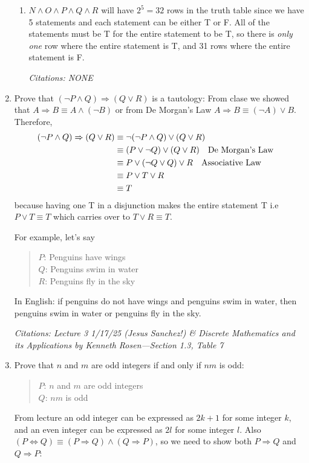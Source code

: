 \documentclass[11pt]{article}
\begin{document}
\begin{enumerate}
\begin{enumerate}
    \item $N \land O \land P \land Q \land R$ will have $2^5 = 32$ rows in the truth table since
    we have 5 statements and each statement can be either T or F. All of the statements must be T
    for the entire statement to be T, so there is \emph{only one} row where the entire statement is T, and
    31 rows where the entire statement is F.

    \textit{Citations: NONE}
  \end{enumerate}

  \newpage
  \item Prove that $(\neg P \land Q) \Rightarrow (Q \lor R)$ is a tautology:
  From clase we showed that $A \Rightarrow B \equiv A \land (\neg B)$ or
  from De Morgan's Law $A \Rightarrow B \equiv (\neg A) \lor B$. Therefore,
  \begin{align*}
    (\neg P \land Q) \Rightarrow (Q \lor R) &\equiv \neg(\neg P \land Q) \lor (Q \lor R) \\
    &\equiv (P \lor \neg Q) \lor (Q \lor R) \qq{De Morgan's Law} \\
    &\equiv P \lor (\neg Q \lor Q) \lor R \qq{Associative Law} \\
    &\equiv P \lor T \lor R \\
    &\equiv T
  \end{align*}
  because having one T in a disjunction makes the entire statement T i.e $P \lor T \equiv T$
  which carries over to $T \lor R \equiv T$.

  For example, let's say 
  \begin{quote}
    $P$: Penguins have wings \\
    $Q$: Penguins swim in water \\
    $R$: Penguins fly in the sky
  \end{quote}
  In English: if penguins do not have wings and penguins swim in water,
  then penguins swim in water or penguins fly in the sky.

  \textit{Citations: Lecture 3 1/17/25 (Jesus Sanchez!) \&
  Discrete Mathematics and its Applications by Kenneth Rosen---Section 1.3, Table 7} 
  \newpage
  \item Prove that $n$ and $m$ are odd integers if and only if $nm$ is odd:

  \begin{quote}
    $P$: $n$ and $m$ are odd integers \\
    $Q$: $nm$ is odd
  \end{quote}
  From lecture an odd integer can be expressed as $2k + 1$ for some integer $k$, and an even integer
  can be expressed as $2l$ for some integer $l$.
  Also $(P \Leftrightarrow Q) \equiv (P \Rightarrow Q) \land (Q \Rightarrow P)$, so
  we need to show both $P \Rightarrow Q$ and $Q \Rightarrow P$:


\end{enumerate}
\end{document}
